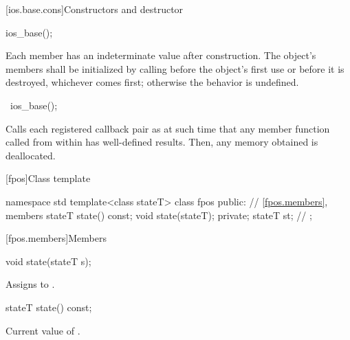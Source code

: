[ios.base.cons]{Constructors and destructor}

%
\begin{itemdecl}
ios_base();
\end{itemdecl}

\begin{itemdescr}
\pnum
\effects
Each
member has an indeterminate value after construction.
The object's members shall be initialized by calling
before the object's first use or before it is destroyed, whichever comes first; otherwise
the behavior is undefined.
\end{itemdescr}

%
\begin{itemdecl}
~ios_base();
\end{itemdecl}

\begin{itemdescr}
\pnum
\effects
Calls each registered callback pair
 as
at such time that any
member function called from within
has well-defined results.
Then, any memory obtained is deallocated.
\end{itemdescr}

[fpos]{Class template }

%
\begin{codeblock}
namespace std {
  template<class stateT> class fpos {
  public:
    // \ref{fpos.members}, members
    stateT state() const;
    void state(stateT);
  private;
    stateT st;                  // \expos
  };
}
\end{codeblock}

[fpos.members]{Members}

%
\begin{itemdecl}
void state(stateT s);
\end{itemdecl}

\begin{itemdescr}
\pnum
\effects
Assigns  to .
\end{itemdescr}

%
\begin{itemdecl}
stateT state() const;
\end{itemdecl}

\begin{itemdescr}
\pnum
\returns
Current value of .
\end{itemdescr}

